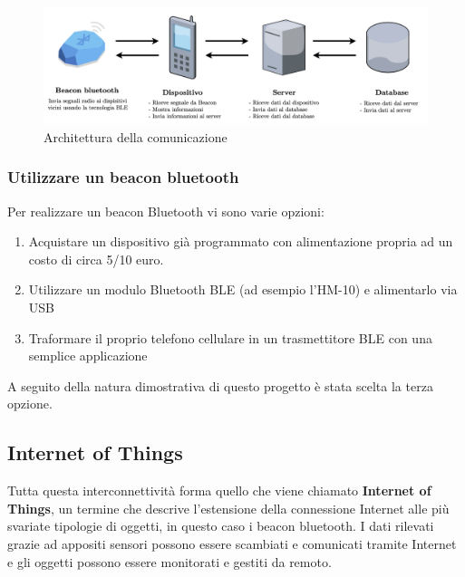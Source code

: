 \begin{center}
\begin{figure}[htp]
    \centering
    \includegraphics[width=15cm]{diagrams/diagramma_comunicazione.png}
    \caption{Architettura della comunicazione}
    \label{fig:architettura_comunicazione}
\end{figure}
\end{center}

\subsubsection{Utilizzare un beacon bluetooth}
Per realizzare un beacon Bluetooth vi sono varie opzioni:
\begin{enumerate}
    \item Acquistare un dispositivo già programmato con alimentazione propria ad un costo di circa 5/10 euro.
    \item Utilizzare un modulo Bluetooth BLE (ad esempio l'HM-10) e alimentarlo via USB
    \item Traformare il proprio telefono cellulare in un trasmettitore BLE con una semplice applicazione
\end{enumerate}

A seguito della natura dimostrativa di questo progetto è stata scelta la terza opzione.

\subsection{Internet of Things} Tutta questa interconnettività forma quello che viene chiamato \textbf{Internet of Things}, un termine che descrive l'estensione della connessione Internet alle più svariate tipologie di oggetti, in questo caso i beacon bluetooth. I dati rilevati grazie ad appositi sensori possono essere scambiati e comunicati tramite Internet e gli oggetti possono essere monitorati e gestiti da remoto.



